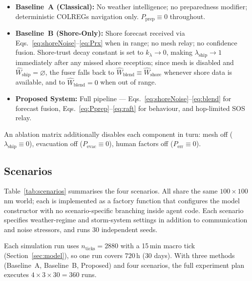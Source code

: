 \documentclass[cameraready]{Interspeech}
\begin{document}
\begin{itemize}[leftmargin=1.2em, itemsep=2pt]
    \item \textbf{Baseline~A (Classical):} No weather intelligence; no preparedness modifier; deterministic COLREGs navigation only. $P_\text{prep} \equiv 0$ throughout.
    \item \textbf{Baseline~B (Shore-Only):} Shore forecast received via Eqs.~\ref{eq:shoreNoise}--\ref{eq:Prx} when in range; no mesh relay; no confidence fusion. Shore-trust decay constant is set to $k_\lambda \to 0$, making $\lambda_\text{ship} \to 1$ immediately after any missed shore reception; since mesh is disabled and $\hat{W}_\text{ship} = \varnothing$, the fuser falls back to $\hat{W}_\text{blend} \equiv \hat{W}_\text{shore}$ whenever shore data is available, and to $\hat{W}_\text{blend} = 0$ when out of range.
    \item \textbf{Proposed System:} Full pipeline — Eqs.~\ref{eq:shoreNoise}--\ref{eq:blend} for forecast fusion, Eqs.~\ref{eq:Pprep}--\ref{eq:raft} for behaviour, and hop-limited SOS relay.
\end{itemize}

An ablation matrix additionally disables each component in turn: mesh off ($\lambda_\text{ship} \equiv 0$), evacuation off ($P_\text{evac} \equiv 0$), human factors off ($P_\text{err} \equiv 0$).

\subsection{Scenarios}

Table~\ref{tab:scenarios} summarises the four scenarios. All share the same $100 \times 100$\,nm world; each is implemented as a factory function that configures the model constructor with no scenario-specific branching inside agent code. Each scenario specifies weather-regime and storm-system settings in addition to communication and noise stressors, and runs 30 independent seeds.

Each simulation run uses $n_\text{ticks}=2880$ with a 15\,min macro tick (Section~\ref{sec:model}), so one run covers $720$\,h ($30$ days). With three methods (Baseline~A, Baseline~B, Proposed) and four scenarios, the full experiment plan executes $4 \times 3 \times 30 = 360$ runs.
\end{document}
